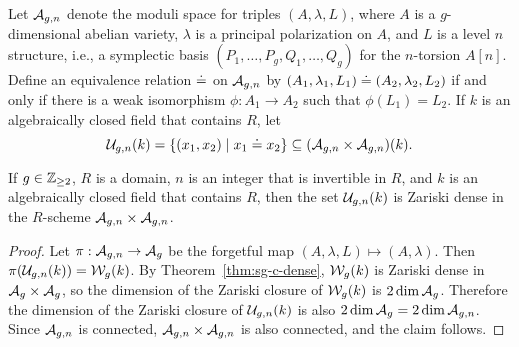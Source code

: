 \documentclass{amsart}
\begin{document}

Let $\mathcal{A}_{g,n}$ denote the moduli space for triples $(A,\lambda,L)$, where $A$ is a $g$-dimensional abelian variety, $\lambda$ is a principal polarization on $A$, and $L$ is a level $n$ structure, i.e., a symplectic basis $(P_1,\ldots,P_g,Q_1,\ldots,Q_g)$ for the $n$-torsion $A[n]$. Define an equivalence relation $\doteq$ on $\mathcal{A}_{g,n}$ by $(A_1, \lambda_1, L_1) \doteq (A_2, \lambda_2, L_2)$ if and only if %
there is a weak isomorphism $\phi: A_1 \to A_2$ such that $\phi(L_1) = L_2$. If $k$ is an algebraically closed field that contains $R$, let 
\[
\mathcal{U}_{g,n}(k) =  \{(x_1,x_2) \mid x_1 \doteq x_2 \}  \subseteq (\mathcal{A}_{g,n} \times \mathcal{A}_{g,n})(k).
\]
\begin{proposition}\label{prop:medium-isomorphic}
  If $g\in\mathbb{Z}_{\ge 2}$, $R$ is a domain, $n$ is an integer that is invertible in $R$, and $k$ is an algebraically closed field that contains $R$, then the set $\mathcal{U}_{g,n}(k)$ is Zariski dense in the $R$-scheme $\mathcal{A}_{g,n} \times \mathcal{A}_{g,n}$.
\end{proposition}

\begin{proof}
  Let $\pi: \mathcal{A}_{g,n} \to \mathcal{A}_g$ be the forgetful map $(A,\lambda,L) \mapsto (A,\lambda)$. Then $\pi(\mathcal{U}_{g,n}(k)) = \mathcal{W}_g(k)$. By Theorem~\ref{thm:sg-c-dense}, $\mathcal{W}_g(k)$ is Zariski dense in $\mathcal{A}_g \times \mathcal{A}_g$, so the dimension of the Zariski closure of $\mathcal{W}_g(k)$ is $2 \dim \mathcal{A}_g$. Therefore the dimension of the Zariski closure of $\mathcal{U}_{g,n}(k)$ is also $2 \dim \mathcal{A}_g = 2 \dim \mathcal{A}_{g,n}$. Since $\mathcal{A}_{g,n}$ is connected, $\mathcal{A}_{g,n} \times \mathcal{A}_{g,n}$ is also connected, and the claim follows.
\end{proof}
\end{document}
